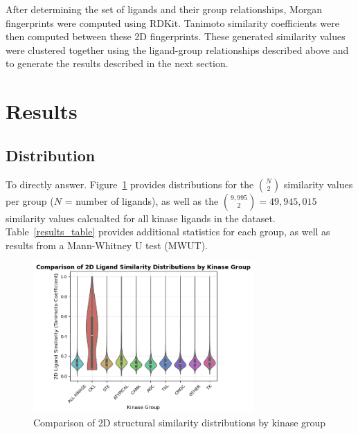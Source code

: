 \documentclass[11pt]{article}
\begin{document}
After determining the set of ligands and their group relationships, Morgan fingerprints were computed using RDKit. 
Tanimoto similarity coefficients were then computed between these 2D fingerprints. 
These generated similarity values were clustered together using the ligand-group relationships described above and to generate the results described in the next section.
\section*{Results}
\subsection*{Distribution}
To directly answer.
Figure~\ref{violin_plot} provides distributions for the ${N\choose 2}$ similarity values per group ($N$ = number of ligands), as well as the ${9,995 \choose 2} = 49,945,015$ similarity values calcualted for all kinase ligands in the dataset. Table~\ref{results_table} provides additional statistics for each group, as well as results from a Mann-Whitney U test (MWUT).
\begin{figure}[H]
    \centering
    \includegraphics[width=0.75\textwidth]{../figures/violin_plot.png}
    \caption{Comparison of 2D structural similarity distributions by kinase group}
    \label{violin_plot}
\end{figure}
\end{document}
